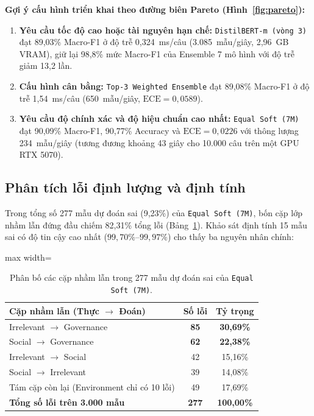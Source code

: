 \documentclass[journal,a4paper]{IEEEtran}
\newcommand{\best}[1]{\textbf{#1}}
\newcommand{\code}[1]{\texttt{\small #1}}
\begin{document}
\textbf{Gợi ý cấu hình triển khai theo đường biên Pareto (Hình~\ref{fig:pareto}):}
\begin{enumerate}[leftmargin=*, itemsep=2pt, topsep=2pt]
  \item \textbf{Yêu cầu tốc độ cao hoặc tài nguyên hạn chế:} \code{DistilBERT-m (vòng~3)} đạt 89,03\% Macro-F1 ở độ trễ 0,324~ms/câu (3.085~mẫu/giây, 2,96~GB VRAM), giữ lại 98,8\% mức Macro-F1 của Ensemble 7 mô hình với độ trễ giảm 13,2 lần.
  \item \textbf{Cấu hình cân bằng:} \code{Top-3 Weighted Ensemble} đạt 89,08\% Macro-F1 ở độ trễ 1,54~ms/câu (650~mẫu/giây, $\text{ECE}=0{,}0589$).
  \item \textbf{Yêu cầu độ chính xác và độ hiệu chuẩn cao nhất:} \code{Equal Soft (7M)} đạt 90,09\% Macro-F1, 90,77\% Accuracy và $\text{ECE}=0{,}0226$ với thông lượng 234~mẫu/giây (tương đương khoảng 43 giây cho 10.000 câu trên một GPU RTX 5070).
\end{enumerate}

\subsection{Phân tích lỗi định lượng và định tính}

Trong tổng số 277 mẫu dự đoán sai (9,23\%) của \code{Equal Soft (7M)}, bốn cặp lớp nhầm lẫn đứng đầu chiếm 82,31\% tổng lỗi (Bảng~\ref{tab:errors}). Khảo sát định tính 15 mẫu sai có độ tin cậy cao nhất ($99{,}70\%\text{--}99{,}97\%$) cho thấy ba nguyên nhân chính:

\begin{table}[!t]
\centering
\caption{Phân bố các cặp nhầm lẫn trong 277 mẫu dự đoán sai của \code{Equal Soft (7M)}.}
\label{tab:errors}
\footnotesize
\renewcommand{\arraystretch}{1.15}
\setlength{\tabcolsep}{6pt}
\begin{adjustbox}{max width=\columnwidth}
\begin{tabular}{@{}lcc@{}}
\toprule
\textbf{Cặp nhầm lẫn (Thực $\rightarrow$ Đoán)} & \textbf{Số lỗi} & \textbf{Tỷ trọng} \\
\midrule
Irrelevant $\rightarrow$ Governance & \best{85} & \best{30,69\%} \\
Social $\rightarrow$ Governance & \best{62} & \best{22,38\%} \\
Irrelevant $\rightarrow$ Social & 42 & 15,16\% \\
Social $\rightarrow$ Irrelevant & 39 & 14,08\% \\
Tám cặp còn lại (Environment chỉ có 10 lỗi) & 49 & 17,69\% \\
\midrule
\textbf{Tổng số lỗi trên 3.000 mẫu} & \textbf{277} & \textbf{100,00\%} \\
\bottomrule
\end{tabular}
\end{adjustbox}
\end{table}
\end{document}
